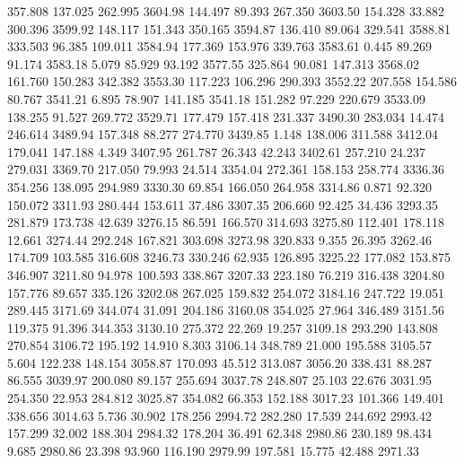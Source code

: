  357.808  137.025  262.995      3604.98
 144.497   89.393  267.350      3603.50
 154.328   33.882  300.396      3599.92
 148.117  151.343  350.165      3594.87
 136.410   89.064  329.541      3588.81
 333.503   96.385  109.011      3584.94
 177.369  153.976  339.763      3583.61
   0.445   89.269   91.174      3583.18
   5.079   85.929   93.192      3577.55
 325.864   90.081  147.313      3568.02
 161.760  150.283  342.382      3553.30
 117.223  106.296  290.393      3552.22
 207.558  154.586   80.767      3541.21
   6.895   78.907  141.185      3541.18
 151.282   97.229  220.679      3533.09
 138.255   91.527  269.772      3529.71
 177.479  157.418  231.337      3490.30
 283.034   14.474  246.614      3489.94
 157.348   88.277  274.770      3439.85
   1.148  138.006  311.588      3412.04
 179.041  147.188    4.349      3407.95
 261.787   26.343   42.243      3402.61
 257.210   24.237  279.031      3369.70
 217.050   79.993   24.514      3354.04
 272.361  158.153  258.774      3336.36
 354.256  138.095  294.989      3330.30
  69.854  166.050  264.958      3314.86
   0.871   92.320  150.072      3311.93
 280.444  153.611   37.486      3307.35
 206.660   92.425   34.436      3293.35
 281.879  173.738   42.639      3276.15
  86.591  166.570  314.693      3275.80
 112.401  178.118   12.661      3274.44
 292.248  167.821  303.698      3273.98
 320.833    9.355   26.395      3262.46
 174.709  103.585  316.608      3246.73
 330.246   62.935  126.895      3225.22
 177.082  153.875  346.907      3211.80
  94.978  100.593  338.867      3207.33
 223.180   76.219  316.438      3204.80
 157.776   89.657  335.126      3202.08
 267.025  159.832  254.072      3184.16
 247.722   19.051  289.445      3171.69
 344.074   31.091  204.186      3160.08
 354.025   27.964  346.489      3151.56
 119.375   91.396  344.353      3130.10
 275.372   22.269   19.257      3109.18
 293.290  143.808  270.854      3106.72
 195.192   14.910    8.303      3106.14
 348.789   21.000  195.588      3105.57
   5.604  122.238  148.154      3058.87
 170.093   45.512  313.087      3056.20
 338.431   88.287   86.555      3039.97
 200.080   89.157  255.694      3037.78
 248.807   25.103   22.676      3031.95
 254.350   22.953  284.812      3025.87
 354.082   66.353  152.188      3017.23
 101.366  149.401  338.656      3014.63
   5.736   30.902  178.256      2994.72
 282.280   17.539  244.692      2993.42
 157.299   32.002  188.304      2984.32
 178.204   36.491   62.348      2980.86
 230.189   98.434    9.685      2980.86
  23.398   93.960  116.190      2979.99
 197.581   15.775   42.488      2971.33

